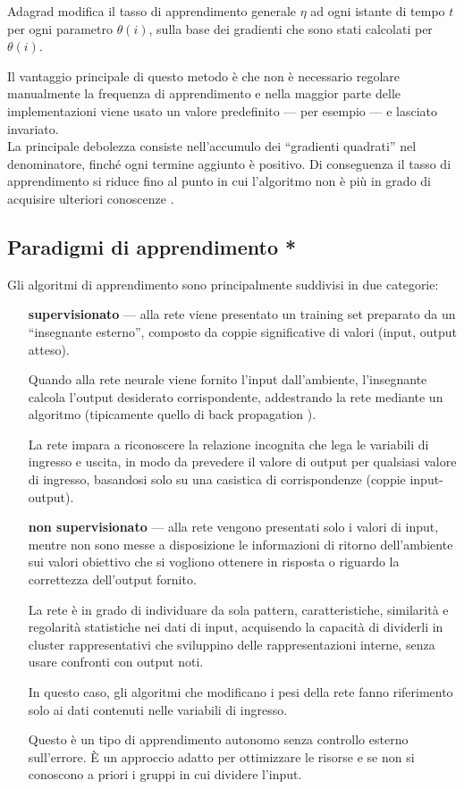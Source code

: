 Adagrad modifica il tasso di apprendimento generale $\eta$ ad ogni istante di tempo $t$ per ogni parametro $\theta(i)$, sulla base dei gradienti che sono stati calcolati per $\theta(i)$.

Il vantaggio principale di questo metodo è che non è necessario regolare manualmente la frequenza di apprendimento e nella maggior parte delle implementazioni viene usato un valore predefinito --- per esempio  --- e lasciato invariato.\\
La principale debolezza consiste nell'accumulo dei ``gradienti quadrati'' nel denominatore, finché ogni termine aggiunto è positivo. Di conseguenza il tasso di apprendimento si riduce fino al punto in cui l'algoritmo non è più in grado di acquisire ulteriori conoscenze \cite{ruder2016overview}. 

\subsection{Paradigmi di apprendimento *}
\label{subsec:Paradigmi di apprendimento}

Gli algoritmi di apprendimento sono principalmente suddivisi in due categorie:
\begin{itemize}
	\item[\bfseries supervisionato] --- alla rete viene presentato un training set preparato da un ``insegnante esterno'', composto da coppie significative di valori (input, output atteso).
	
	Quando alla rete neurale viene fornito l'input dall'ambiente, l'insegnante calcola l'output desiderato corrispondente, addestrando la rete mediante un algoritmo (tipicamente quello di back propagation \cite{horikawa1992fuzzy}). 
	
	La rete impara a riconoscere la relazione incognita che lega le variabili di ingresso e uscita, in modo da prevedere il valore di output per qualsiasi valore di ingresso, basandosi solo su una casistica di corrispondenze (coppie input-output).
	
	\item[\bfseries non supervisionato] --- alla rete vengono presentati solo i valori di input, mentre non sono messe a disposizione le informazioni di ritorno dell'ambiente sui valori obiettivo che si vogliono ottenere in risposta o riguardo la correttezza dell'output fornito.
	
	La rete è in grado di individuare da sola pattern, caratteristiche, similarità e regolarità statistiche nei dati di input, acquisendo la capacità di dividerli in cluster rappresentativi che sviluppino delle rappresentazioni interne, senza usare confronti con output noti.
	
	In questo caso, gli algoritmi che modificano i pesi della rete fanno riferimento solo ai dati contenuti nelle variabili di ingresso.
	
	Questo è un tipo di apprendimento autonomo senza controllo esterno sull'errore. È un approccio adatto per ottimizzare le risorse e se non si conoscono a priori i gruppi in cui dividere l'input.
\end{itemize}

